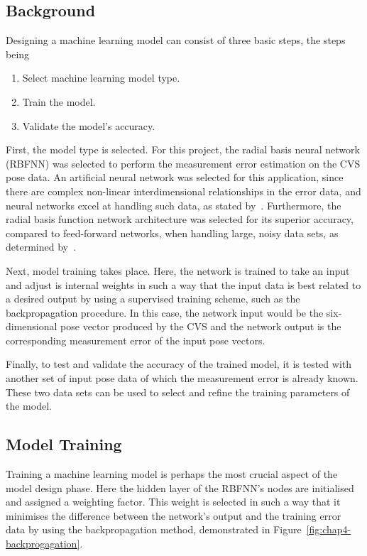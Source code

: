 \subsection{Background}

Designing a machine learning model can consist of three basic steps, the steps being

\begin{enumerate}
  \item Select machine learning model type.
  \item Train the model.
  \item Validate the model's accuracy. 
\end{enumerate}

First, the model type is selected. For this project, the radial basis neural network (RBFNN) was selected to perform the measurement error estimation on the CVS pose data. An artificial neural network was selected for this application, since there are complex non-linear interdimensional relationships in the error data, and neural networks excel at handling such data, as stated by~\cite{tu1996advantages}. Furthermore, the radial basis function network architecture was selected for its superior accuracy, compared to feed-forward networks, when handling large, noisy data sets, as determined by~\cite{xie2011comparison}. 

Next, model training takes place. Here, the network is trained to take an input and adjust is internal weights in such a way that the input data is best related to a desired output by using a supervised training scheme, such as the backpropagation procedure. In this case, the network input would be the six-dimensional pose vector produced by the CVS and the network output is the corresponding measurement error of the input pose vectors.  

Finally, to test and validate the accuracy of the trained model, it is tested with another set of input pose data of which the measurement error is already known. These two data sets can be used to select and refine the training parameters of the model. 

\subsection{Model Training}

Training a machine learning model is perhaps the most crucial aspect of the model design phase. Here the hidden layer of the RBFNN's nodes are initialised and assigned a weighting factor. This weight is selected in such a way that it minimises the difference between the network's output and the training error data by using the backpropagation method, demonstrated in Figure~\ref{fig:chap4-backprogagation}.

